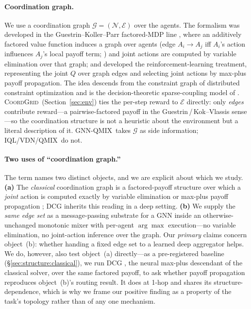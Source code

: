 \documentclass[10pt]{article}
\newcommand{\algoname}[1]{\textsc{#1}}
\newcommand{\iql}{\algoname{IQL}}
\newcommand{\vdn}{\algoname{VDN}}
\newcommand{\qmix}{\algoname{QMIX}}
\newcommand{\gnnqmix}{\algoname{GNN-QMIX}}
\newcommand{\coordgrid}{\textsc{CoordGrid}}
\newcommand{\Nset}{\mathcal{N}}
\newcommand{\Egraph}{\mathcal{E}}
\newcommand{\Gtask}{\mathcal{G}}
\begin{document}
\paragraph{Coordination graph.} We use a coordination graph
$\Gtask = (\Nset, \Egraph)$ over the agents. The formalism was developed in
the Guestrin--Koller--Parr factored-MDP line
\citep{guestrin_2001_factoredmdp,guestrin_2002_coordrl,guestrin_2003_factoredmdp_jair},
where an additively factored value function induces a graph over agents (edge
$A_i\!\to\!A_j$ iff $A_i$'s action influences $A_j$'s local payoff term;
\citealp{guestrin_2002_contextspecific}) and joint actions are computed by
variable elimination over that graph; \citet{kok_2004_sparseq} and
\citet{kok_2006_payoffprop} developed the reinforcement-learning treatment,
representing the joint $Q$ over graph edges and selecting joint actions by
max-plus payoff propagation. The idea descends from the constraint graph of
distributed constraint optimization \citep{modi_2005_adopt,fioretto_2018_dcopsurvey}
and is the decision-theoretic sparse-coupling model of
\citet{melo_2011_decsimdp}. \coordgrid\ (Section~\ref{sec:env}) ties the
per-step reward to $\Egraph$ directly: only \emph{edges} contribute reward---a
pairwise-factored payoff in the Guestrin\,/\,Kok--Vlassis sense---so the
coordination structure is not a heuristic about the environment but a literal
description of it. \gnnqmix\ takes $\Gtask$ as side information;
\iql/\vdn/\qmix\ do not.

\paragraph{Two uses of ``coordination graph.''} The term names two distinct
objects, and we are explicit about which we study. \textbf{(a)} The
\emph{classical} coordination graph is a factored-payoff structure over which a
\emph{joint} action is computed exactly by variable elimination or max-plus
payoff propagation \citep{guestrin_2003_factoredmdp_jair,kok_2006_payoffprop};
\algoname{DCG} \citep{boehmer_2020_dcg} inherits this reading in a deep setting.
\textbf{(b)} We supply the \emph{same edge set} as a message-passing substrate
for a GNN inside an otherwise-unchanged monotonic mixer with per-agent
$\arg\max$ execution---no variable elimination, no joint-action inference over
the graph. Our \emph{primary} claims concern object~(b): whether handing a fixed
edge set to a learned deep aggregator helps. We do, however, also test object~(a)
directly---as a pre-registered baseline (\S\ref{sec:structure:classical}), we run
\algoname{DCG} \citep{boehmer_2020_dcg}, the neural max-plus descendant of the
classical solver, over the same factored payoff, to ask whether payoff
propagation reproduces object~(b)'s routing result. It does at 1-hop and shares
its structure-dependence, which is why we frame our positive finding as a
property of the task's topology rather than of any one mechanism.
\end{document}
